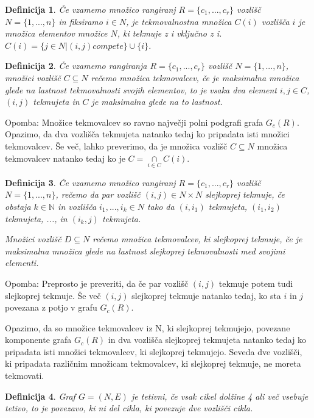 \documentclass[a4paper, 12pt]{book}
\newtheorem{definicija}{Definicija}[chapter]
\begin{document}
\begin{definicija}
    Če vzamemo množico rangiranj $R = \{ c_1, ..., c_r \}$ vozlišč $N = \{ 1, ..., n\}$ in fiksiramo $i \in N$, je tekmovalnostna množica $C(i)$ vozlišča $i$ je množica elementov množice $N$, ki tekmuje z i vključno z i. $C(i) = \{ j \in N | (i, j) compete \} \cup \{ i \}$.
\end{definicija}

\begin{definicija}
    Če vzamemo rangiranja $R = \{ c_1, ..., c_r\}$ vozlišč $N = \{ 1, ..., n\}$, množici  vozlišč $C \subseteq N$ rečemo množica tekmovalcev, če je maksimalna množica glede na lastnost tekmovalnosti svojih elementov, to je vsaka dva element $i, j \in C$, $(i, j)$ tekmujeta in $C$ je maksimalna glede na to lastnost.
\end{definicija}

Opomba: Množice tekmovalcev so ravno največji polni podgrafi grafa $G_c(R)$. Opazimo, da dva vozlišča tekmujeta natanko tedaj ko pripadata isti množici tekmovalcev. Še več, lahko preverimo, da je množica vozlišč $C \subseteq N$ množica tekmovalcev natanko tedaj ko je $C = \underset{i \in C}{\cap}C(i)$.

\begin{definicija}
    Če vzamemo množico rangiranj $R = \{ c_1, ..., c_r\}$ vozlišč $N = \{ 1, ..., n\}$, rečemo da par vozlišč $(i, j) \in N \times N$ slejkoprej tekmuje, če obstaja $k \in \mathbb{N}$ in vozlišča $i_1, ..., i_k \in N$ tako da $(i, i_1)$ tekmujeta, $(i_1, i_2)$ tekmujeta, ..., in $(i_k, j)$ tekmujeta.

    Množici vozlišč $D \subseteq N$ rečemo množica tekmovalcev, ki slejkoprej tekmuje, če je maksimalna množica glede na lastnost slejkoprej tekmovalnosti med svojimi elementi.
\end{definicija}

Opomba: Preprosto je preveriti, da če par vozlišč $(i, j)$ tekmuje potem tudi slejkoprej tekmuje. Še več $(i, j)$ slejkoprej tekmuje natanko tedaj, ko sta $i$ in $j$ povezana z potjo v grafu $G_c(R)$.

Opazimo, da so množice tekmovalcev iz N, ki slejkoprej tekmujejo, povezane komponente grafa $G_c(R)$ in dva vozlišča slejkoprej tekmujeta natanko tedaj ko pripadata isti množici tekmovalcev, ki slejkoprej tekmujejo. Seveda dve vozlišči, ki pripadata različnim množicam tekmovalcev, ki slejkoprej tekmuje, ne moreta tekmovati.

\begin{definicija}
    Graf $G = (N, E)$ je tetivni, če vsak cikel dolžine 4 ali več vsebuje tetivo, to je povezavo, ki ni del cikla, ki povezuje dve vozlišči cikla.
\end{definicija}
\end{document}
